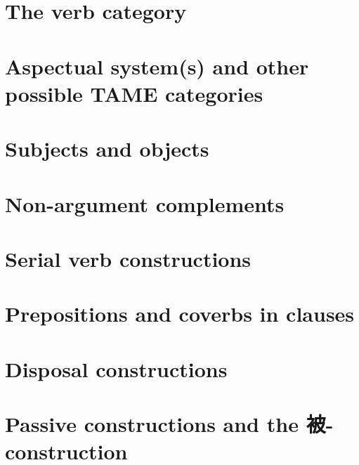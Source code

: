 \documentclass[UTF8, a4paper, oneside, scheme=plain]{ctexbook}
\numberwithin{equation}{chapter}
\numberwithin{equation}{chapter}
\begin{document}


\chapter{The verb category}



\chapter{Aspectual system(s) and other possible TAME categories}\label{chap:aspect}



\chapter{Subjects and objects}%



\chapter{Non-argument complements}



\chapter{Serial verb constructions} %

\chapter{Prepositions and coverbs in clauses}\label{chap:coverbs}



\chapter{Disposal constructions}\label{chap:disposal}

\chapter{Passive constructions and the 被-construction}\label{chap:passive}


\end{document}
